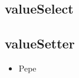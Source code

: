 \subsection{valueSelect}
\label{sub:vSelect}
\subsection{valueSetter}
\label{sub:vSetter}
\begin{itemize}
\item Pepe
\end{itemize}
